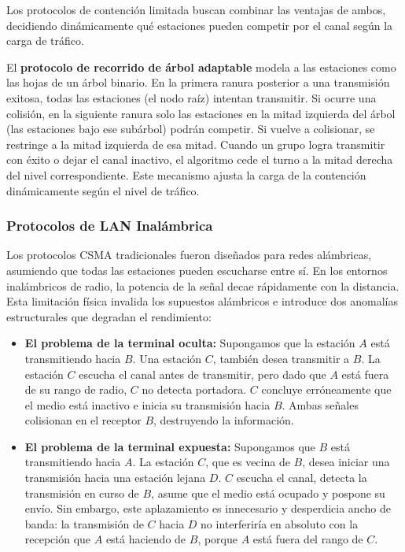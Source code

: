 Los protocolos de contención limitada buscan combinar las ventajas de ambos, decidiendo dinámicamente qué estaciones pueden competir por el canal según la carga de tráfico.

El \textbf{protocolo de recorrido de árbol adaptable} modela a las estaciones como las hojas de un árbol binario. En la primera ranura posterior a una transmisión exitosa, todas las estaciones (el nodo raíz) intentan transmitir. Si ocurre una colisión, en la siguiente ranura solo las estaciones en la mitad izquierda del árbol (las estaciones bajo ese subárbol) podrán competir. Si vuelve a colisionar, se restringe a la mitad izquierda de esa mitad. Cuando un grupo logra transmitir con éxito o dejar el canal inactivo, el algoritmo cede el turno a la mitad derecha del nivel correspondiente. Este mecanismo ajusta la carga de la contención dinámicamente según el nivel de tráfico.


\subsubsection{Protocolos de LAN Inalámbrica}

Los protocolos CSMA tradicionales fueron diseñados para redes alámbricas, asumiendo que todas las estaciones pueden escucharse entre sí. En los entornos inalámbricos de radio, la potencia de la señal decae rápidamente con la distancia. Esta limitación física invalida los supuestos alámbricos e introduce dos anomalías estructurales que degradan el rendimiento:

\begin{itemize}
    \item \textbf{El problema de la terminal oculta:} Supongamos que la estación $A$ está transmitiendo hacia $B$. Una estación $C$, también desea transmitir a $B$. La estación $C$ escucha el canal antes de transmitir, pero dado que $A$ está fuera de su rango de radio, $C$ no detecta portadora. $C$ concluye erróneamente que el medio está inactivo e inicia su transmisión hacia $B$. Ambas señales colisionan en el receptor $B$, destruyendo la información.

    \item \textbf{El problema de la terminal expuesta:} Supongamos que $B$ está transmitiendo hacia $A$. La estación $C$, que es vecina de $B$, desea iniciar una transmisión hacia una estación lejana $D$. $C$ escucha el canal, detecta la transmisión en curso de $B$, asume que el medio está ocupado y pospone su envío. Sin embargo, este aplazamiento es innecesario y desperdicia ancho de banda: la transmisión de $C$ hacia $D$ no interferiría en absoluto con la recepción que $A$ está haciendo de $B$, porque $A$ está fuera del rango de $C$.
\end{itemize}

